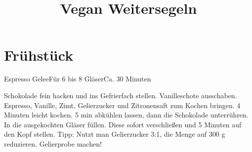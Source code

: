 \documentclass[a4paper,10pt]{article}
\title{\Huge Vegan Weitersegeln}
\begin{document}
    \maketitle
    \begin{center}
    \end{center}
    \thispagestyle{empty}
    \newpage

    \tableofcontents
    \newpage


    \section{Frühstück}

    \begin{recipe}{Espresso Gelee}{Für 6 bis 8 Gläser}{Ca. 30 Minuten}
        
        \freeform \hfill 
        
            Schokolade fein hacken und ins Gefrierfach stellen.
            Vanilleschote ausschaben.
            Espresso, Vanille, Zimt, Gelierzucker und Zitronensaft zum Kochen bringen. 4 Minuten leicht kochen.
            5 min abkühlen lassen, dann die Schokolade unterrühren. 
            In die ausgekochten Gläser füllen. Diese sofort verschließen und 5 Minuten auf den Kopf stellen.
        \freeform
            Tipp: Nutzt man Gelierzucker 3:1, die Menge auf 300 g reduzieren. Gelierprobe machen!
    \end{recipe}
   
\end{document}
